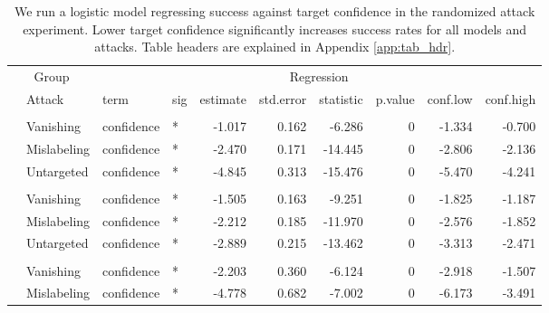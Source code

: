\begin{longtable}[t]{llllrrrrrr}
\caption{\label{tab:target_conf_table}We run a logistic model regressing success against target confidence in the randomized attack experiment. Lower target confidence significantly increases success rates for all models and attacks. Table headers are explained in Appendix \ref{app:tab_hdr}.}\\
\toprule
\multicolumn{2}{c}{Group} & \multicolumn{8}{c}{Regression} \\
\cmidrule(l{3pt}r{3pt}){1-2} \cmidrule(l{3pt}r{3pt}){3-10}
 & Attack & term & sig & estimate & std.error & statistic & p.value & conf.low & conf.high\\
\midrule
\addlinespace[0.3em]
\multicolumn{10}{l}{\textbf{YOLOv3}}\\
\hspace{1em} & Vanishing & confidence & * & -1.017 & 0.162 & -6.286 & 0 & -1.334 & -0.700\\
\cmidrule{2-10}\nopagebreak
\hspace{1em} & Mislabeling & confidence & * & -2.470 & 0.171 & -14.445 & 0 & -2.806 & -2.136\\
\cmidrule{2-10}\nopagebreak
\hspace{1em} & Untargeted & confidence & * & -4.845 & 0.313 & -15.476 & 0 & -5.470 & -4.241\\
\cmidrule{1-10}\pagebreak[0]
\addlinespace[0.3em]
\multicolumn{10}{l}{\textbf{SSD}}\\
\hspace{1em} & Vanishing & confidence & * & -1.505 & 0.163 & -9.251 & 0 & -1.825 & -1.187\\
\cmidrule{2-10}\nopagebreak
\hspace{1em} & Mislabeling & confidence & * & -2.212 & 0.185 & -11.970 & 0 & -2.576 & -1.852\\
\cmidrule{2-10}\nopagebreak
\hspace{1em} & Untargeted & confidence & * & -2.889 & 0.215 & -13.462 & 0 & -3.313 & -2.471\\
\cmidrule{1-10}\pagebreak[0]
\addlinespace[0.3em]
\multicolumn{10}{l}{\textbf{RetinaNet}}\\
\hspace{1em} & Vanishing & confidence & * & -2.203 & 0.360 & -6.124 & 0 & -2.918 & -1.507\\
\cmidrule{2-10}\nopagebreak
\hspace{1em} & Mislabeling & confidence & * & -4.778 & 0.682 & -7.002 & 0 & -6.173 & -3.491\\

\end{longtable}
